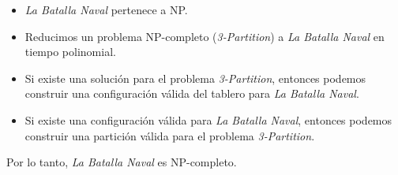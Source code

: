 \begin{itemize}
    \item \textit{La Batalla Naval} pertenece a NP.
    \item Reducimos un problema NP-completo (\textit{3-Partition}) a \textit{La Batalla Naval} en tiempo polinomial.
    \item Si existe una solución para el problema \textit{3-Partition}, entonces podemos construir una configuración válida del tablero para \textit{La Batalla Naval}.
    \item Si existe una configuración válida para \textit{La Batalla Naval}, entonces podemos construir una partición válida para el problema \textit{3-Partition}.
\end{itemize}

Por lo tanto, \textit{La Batalla Naval} es NP-completo.